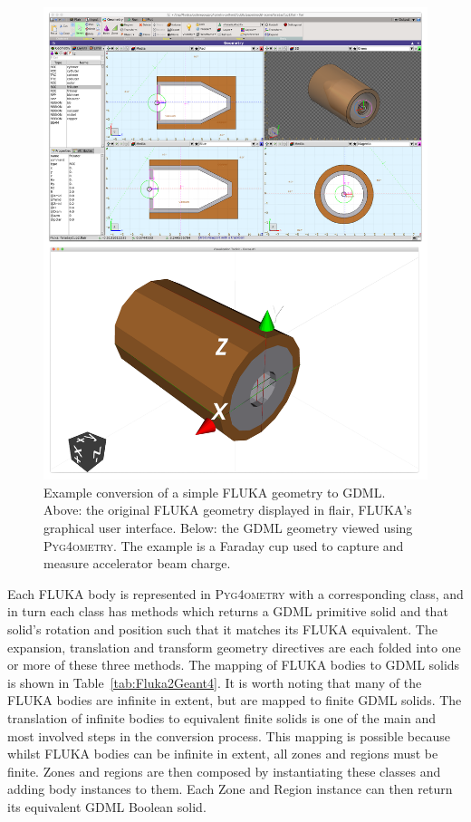 \documentclass[final,5p,times,twocolumn]{elsarticle}
\newcommand{\PYGEOMETRY}{\textsc{Pyg4ometry}}
\begin{document}
\begin{figure}[htbp]
\begin{center}
\includegraphics[width=0.9\columnwidth]{./model-scene/faradayCup2.pdf}
\caption{Example conversion of a simple FLUKA geometry to GDML. Above:
  the original FLUKA geometry displayed in flair, FLUKA's graphical user interface.
  Below: the GDML geometry viewed using \PYGEOMETRY{}. The example is a Faraday cup used to capture
and measure accelerator beam charge.}
\label{fig:fluka-to-geant4-cup}
\end{center}
\end{figure}

Each FLUKA body is represented in \PYGEOMETRY{} with a corresponding
class, and in turn each class has methods which returns a GDML
primitive solid and that solid's rotation and position such that it
matches its FLUKA equivalent.  The expansion, translation and
transform geometry directives are each folded into one or more of
these three methods.  The mapping of FLUKA bodies to GDML solids is
shown in Table~\ref{tab:Fluka2Geant4}.  It is worth noting that many
of the FLUKA bodies are infinite in extent, but are mapped to finite
GDML solids.  The translation of infinite bodies to equivalent finite
solids is one of the main and most involved steps in the conversion process.
This mapping is possible because whilst FLUKA bodies can be infinite
in extent, all zones and regions must be finite.  Zones and regions
are then composed by instantiating these classes and adding body
instances to them.  Each Zone and Region instance can then return its
equivalent GDML Boolean solid.
\end{document}
